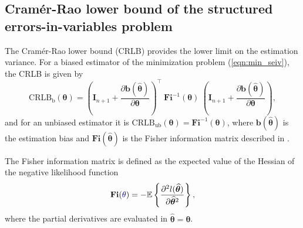 \subsection{Cram\'er-Rao lower bound of the structured errors-in-variables problem}

The Cram\'er-Rao lower bound (CRLB) provides the lower limit on the estimation variance.
For a biased estimator of the minimization problem (\ref{eqn:min_seiv}), the CRLB is given by
\begin{equation} \mathrm{CRLB}_{\mathrm{b}}(\bm{\theta}) = \left( \mathbf{I}_{n+1} + \frac{\partial \mathbf{b} \left( \widehat{\bm{\theta}} \right) }{\partial \bm{\theta} } \right)^\top \ \mathbf{Fi}^{-1}(\bm{\theta}) \ \left( \mathbf{I}_{n+1} + \frac{\partial \mathbf{b} \left( \widehat{\bm{\theta}} \right) }{\partial \bm{\theta} } \right), \label{eqn:CRLB_EIV} \end{equation} 
and for an unbiased estimator it is $\mathrm{CRLB}_{\mathrm{ub}}(\bm{\theta}) = \mathbf{Fi}^{-1}(\bm{\theta})$,
where $\mathbf{b} (\widehat{\bm{\theta}})$ is the estimation bias and $\mathbf{Fi}(\widehat{\bm{\theta}})$ is the Fisher information matrix described in \citet{Pintelon12Book}.

The Fisher information matrix is defined as the expected value of the Hessian of the negative likelihood function 
\begin{equation} \mathbf{Fi}(\color{blue}\theta\color{black}) = - \mathbb{E} \left\{ \frac{\partial ^2 l (\widehat{\bm{\theta}}) }{\partial \widehat{\bm{\theta}}^2 } \right\}, \end{equation}
where the partial derivatives are evaluated in $\widehat{\bm{\theta}} = \bm{\theta}$.

